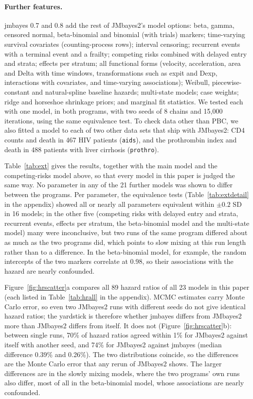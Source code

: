 \documentclass[11pt]{article}
\begin{document}
\paragraph{Further features.} jmbayes 0.7 and 0.8 add the rest of JMbayes2's model options:
beta, gamma, censored normal, beta-binomial and binomial (with trials) markers;
time-varying survival covariates (counting-process rows); interval censoring; recurrent
events with a terminal event and a frailty; competing risks combined with delayed entry and
strata; effects per stratum; all functional forms (velocity, acceleration, area and Delta
with time windows, transformations such as expit and Dexp, interactions with covariates,
and time-varying associations); Weibull, piecewise-constant and natural-spline baseline
hazards; multi-state models; case weights; ridge and horseshoe shrinkage priors; and
marginal fit statistics. We tested each with one model, in both programs, with two seeds
of 8 chains and 15,000 iterations, using the same equivalence test. To check data other
than PBC, we also fitted a model to each of two other data sets that ship with JMbayes2:
CD4 counts and death in 467 HIV patients (\texttt{aids}), and the prothrombin index and
death in 488 patients with liver cirrhosis (\texttt{prothro}).

Table~\ref{tab:ext} gives the results, together with the main model and the competing-risks
model above, so that every model in this paper is judged the same way. No parameter in any
of the 21 further models was shown to differ between the programs. Per parameter, the equivalence tests
(Table~\ref{tab:extdetail} in the appendix) showed all or nearly all parameters equivalent
within $\pm 0.2$ SD in 16 models; in the other five (competing risks with delayed entry and
strata, recurrent events, effects per stratum, the beta-binomial model and the multi-state
model) many were inconclusive, but two runs of the same program differed about
as much as the two programs did, which points to slow mixing at this run length rather
than to a difference. In the beta-binomial model, for example, the random intercepts of
the two markers correlate at 0.98, so their associations with the hazard are nearly
confounded.

Figure~\ref{fig:hrscatter}a compares all 89 hazard ratios of all 23 models in this paper
(each listed in Table~\ref{tab:hrall} in the appendix). MCMC estimates carry Monte Carlo
error, so even two JMbayes2 runs with different seeds do not give identical hazard ratios;
the yardstick is therefore whether jmbayes differs from JMbayes2 more than JMbayes2
differs from itself. It does not (Figure~\ref{fig:hrscatter}b): between single runs, 70\%
of hazard ratios agreed within 1\% for JMbayes2 against itself with another seed, and 74\%
for JMbayes2 against jmbayes (median difference 0.39\% and 0.26\%). The two distributions
coincide, so the differences are the Monte Carlo error that any rerun of JMbayes2 shows. The larger differences are in the
slowly mixing models, where the two programs' own runs also differ, most of all in the
beta-binomial model, whose associations are nearly confounded.
\end{document}
